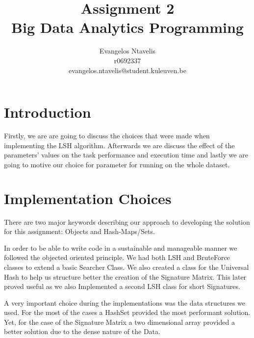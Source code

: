 \documentclass[12pt]{article}
\begin{document}
 
 
 
\title{Assignment 2\\
Big Data Analytics Programming} %
\author{Evangelos Ntavelis\\ %
r0692337 \\
evangelos.ntavelis@student.kuleuven.be}
 
\maketitle

\tableofcontents

\section{Introduction}
Firstly, we are are going to discuss the choices that were made when implementing the LSH algorithm. Afterwards we are discuss the effect of the parameters' values on the task performance and execution time and lastly we are going to motive our choice for parameter for running on the whole dataset.

\section{Implementation Choices}

There are two major keywords describing our approach to developing the solution for this assignment: Objects and Hash-Maps/Sets.

In order to be able to write code in a sustainable and manageable manner we followed the objected oriented principle.
We had both LSH and BruteForce classes to extend a basic Searcher Class.
We also created a class for the Universal Hash to help us structure better the creation of the Signature Matrix. This later proved useful as we also Implemented a second LSH class for short Signatures.

A very important choice during the implementations was the data structures we used. For the most of the  cases a HashSet provided the most performant solution.
Yet, for the case of the Signature Matrix a two dimensional array provided a better solution due to the dense nature of the Data. 
\end{document}
